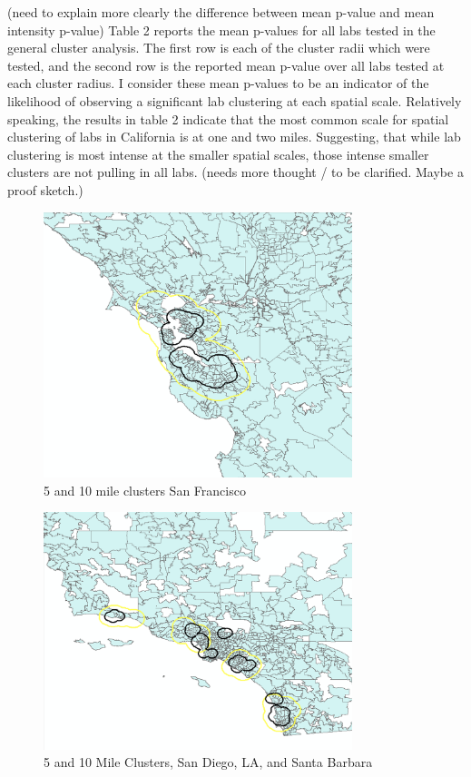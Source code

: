 \documentclass[12pt,letterpaper]{article}
\begin{document}
\begin{table}[H]
\centering
{}
\caption{}
\label{tab:2}
\end{table}
{\color{red}(need to explain more clearly the difference between mean p-value and mean intensity p-value)}
Table 2 reports the mean p-values for all labs tested in the general cluster analysis. The first row is each of the cluster radii which were tested, and the second row is the reported mean p-value over all labs tested at each cluster radius. I consider these mean p-values to be an indicator of the likelihood of observing a significant lab clustering at each spatial scale. Relatively speaking, the results in table 2 indicate that the most common scale for spatial clustering of labs in California is at one and two miles. Suggesting, that while lab clustering is most intense at the smaller spatial scales, those intense smaller clusters are not pulling in all labs. {\color{blue}(needs more thought / to be clarified. Maybe a proof sketch.)}
\begin{figure}[H]
    \centering
    \includegraphics[width=9cm]{SF.png}
    \caption{5 and 10 mile clusters San Francisco}
    \label{fig:lab2}
\end{figure}
\begin{figure}[H]
    \centering
    \includegraphics[width=9cm]{LA.png}
    \caption{5 and 10 Mile Clusters, San Diego, LA, and Santa Barbara}
    \label{fig:lab1}
\end{figure}
\end{document}
